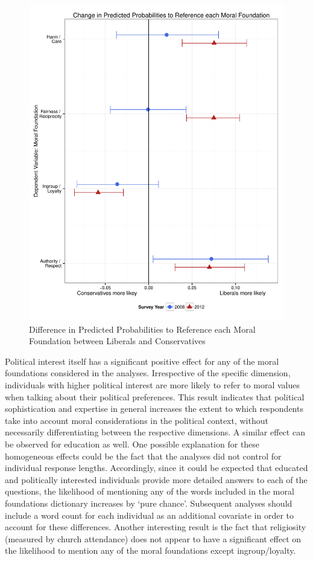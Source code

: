 \documentclass[12pt]{article}
\begin{document}
\begin{figure}\centering
\includegraphics[scale=.4]{../calc/fig/m1_mft.pdf}
\caption{Difference in Predicted Probabilities to Reference each Moral Foundation between Liberals and Conservatives}\label{fig:m1_mft}
\end{figure}

Political interest itself has a significant positive effect for any of the moral foundations considered in the analyses. Irrespective of the specific dimension, individuals with higher political interest are more likely to refer to moral values when talking about their political preferences. This result indicates that political sophistication and expertise in general increases the extent to which respondents take into account moral considerations in the political context, without necessarily differentiating between the respective dimensions. A similar effect can be observed for education as well. One possible explanation for these homogeneous effects could be the fact that the analyses did not control for individual response lengths. Accordingly, since it could be expected that educated and politically interested individuals provide more detailed answers to each of the questions, the likelihood of mentioning any of the words included in the moral foundations dictionary increases by `pure chance'. Subsequent analyses should include a word count for each individual as an additional covariate in order to account for these differences. Another interesting result is the fact that religiosity (measured by church attendance) does not appear to have a significant effect on the likelihood to mention any of the moral foundations except ingroup/loyalty.
\end{document}
